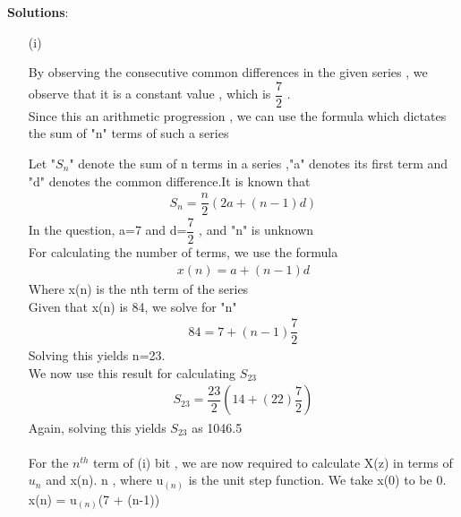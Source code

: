 \documentclass[journal,12pt,twocolumn]{IEEEtran}
\theoremstyle{remark}
\begin{document}
\vspace{0.5cm}
\textbf{Solutions}:
\begin{enumerate}
\item[(i)]   

By observing the consecutive common differences in the given series , we observe that it is a constant value , which is $\dfrac{7}{2}$ .\\
Since this an arithmetic progression , we can use the formula which dictates the sum of "n" terms of such a series

Let "$S_n$" denote the sum of n terms in a series ,"a" denotes its first term and "d" denotes the common difference.It is known that
\begin{align}
{S_n} = \dfrac{n}{2}(2a + (n-1)d)\label{eq:1}
\end{align}
In the question, a=7 and d=$\dfrac{7}{2}$ , and "n" is unknown\\
For calculating the number of terms, we use the formula
\begin{align}
x(n) = a + (n-1)d\label{eq:2}
\end{align}
Where x(n) is the nth term of the series\\
Given that x(n) is 84, we solve for "n"
\begin{align}  
84 = 7+(n-1)\dfrac{7}{2}
\end{align}
Solving this yields n=23.\\
We now use this result for calculating $S_{23}$
\begin{align}
    S_{23} = \dfrac{23}{2}(14+(22)\dfrac{7}{2})
    \end{align}
Again, solving this yields $S_{23}$ as 1046.5\\\\
For the $n^{th}$ term of (i) bit , we are now required to calculate X(z) in terms of $u_n$ and x(n). \forall n , where u$_{(n)}$ is the unit step function. We take x(0) to be 0.\\
x(n) = u$_{(n)}$(7 + (n-1))\\


\end{enumerate}
\end{document}
